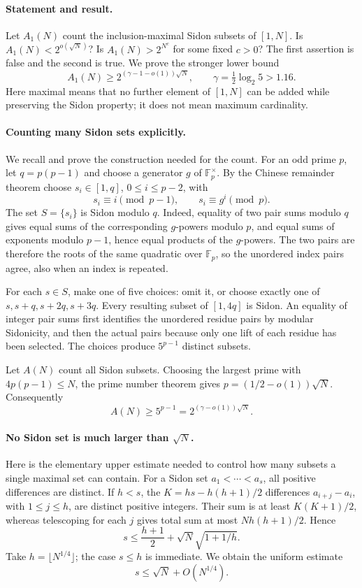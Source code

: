 \paragraph{Statement and result.}
Let \(A_1(N)\) count the inclusion-maximal Sidon subsets of \([1,N]\). Is \(A_1(N)<2^{o(\sqrt N)}\)? Is \(A_1(N)>2^{N^c}\) for some fixed \(c>0\)? The first assertion is false and the second is true. We prove the stronger lower bound
\[
 A_1(N)\geq2^{(\gamma-1-o(1))\sqrt N},
 \qquad \gamma=\tfrac12\log_2 5>1.16.
\tag{1}
\]
Here maximal means that no further element of \([1,N]\) can be added while preserving the Sidon property; it does not mean maximum cardinality.

\paragraph{Counting many Sidon sets explicitly.}
We recall and prove the construction needed for the count. For an odd prime \(p\), let \(q=p(p-1)\) and choose a generator \(g\) of \(\mathbb F_p^\times\). By the Chinese remainder theorem choose \(s_i\in[1,q]\), \(0\leq i\leq p-2\), with
\[
 s_i\equiv i\pmod{p-1},\qquad s_i\equiv g^i\pmod p.
\]
The set \(S=\{s_i\}\) is Sidon modulo \(q\). Indeed, equality of two pair sums modulo \(q\) gives equal sums of the corresponding \(g\)-powers modulo \(p\), and equal sums of exponents modulo \(p-1\), hence equal products of the \(g\)-powers. The two pairs are therefore the roots of the same quadratic over \(\mathbb F_p\), so the unordered index pairs agree, also when an index is repeated.

For each \(s\in S\), make one of five choices: omit it, or choose exactly one of \(s,s+q,s+2q,s+3q\). Every resulting subset of \([1,4q]\) is Sidon. An equality of integer pair sums first identifies the unordered residue pairs by modular Sidonicity, and then the actual pairs because only one lift of each residue has been selected. The choices produce \(5^{p-1}\) distinct subsets.

Let \(A(N)\) count all Sidon subsets. Choosing the largest prime with \(4p(p-1)\leq N\), the prime number theorem gives \(p=(1/2-o(1))\sqrt N\). Consequently
\[
 A(N)\geq5^{p-1}=2^{(\gamma-o(1))\sqrt N}.
\tag{2}
\]

\paragraph{No Sidon set is much larger than \(\sqrt N\).}
Here is the elementary upper estimate needed to control how many subsets a single maximal set can contain. For a Sidon set \(a_1<\cdots<a_s\), all positive differences are distinct. If \(h<s\), the
\(K=hs-h(h+1)/2\) differences \(a_{i+j}-a_i\), with \(1\leq j\leq h\), are distinct positive integers. Their sum is at least \(K(K+1)/2\), whereas telescoping for each \(j\) gives total sum at most \(Nh(h+1)/2\). Hence
\[
 s\leq\frac{h+1}{2}+\sqrt N\sqrt{1+1/h}.
\]
Take \(h=\lfloor N^{1/4}\rfloor\); the case \(s\leq h\) is immediate. We obtain the uniform estimate
\[
 s\leq\sqrt N+O(N^{1/4}).
\tag{3}
\]

